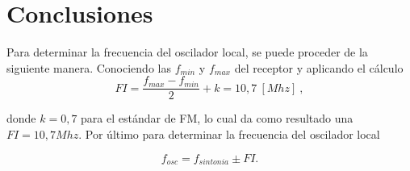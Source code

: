   \section{Conclusiones}

  Para determinar la frecuencia del oscilador local, se puede proceder de la 
  siguiente manera. Conociendo las \(f_{min}\) y \(f_{max}\) del receptor y
  aplicando el cálculo 
    \begin{equation*}
      FI = \dfrac{f_{max} - f_{min}}{2} + k = 10,7~[Mhz]~,
    \end{equation*}

  donde \(k = 0,7\) para el estándar de FM, lo cual da como resultado una 
  \(FI = 10,7 Mhz\). Por último para determinar la frecuencia del oscilador local
    
    \begin{equation*}
      f_{osc} = f_{sintonia} \pm FI .
    \end{equation*}
